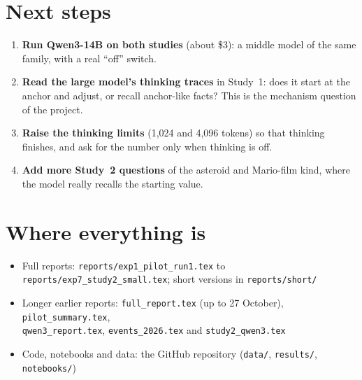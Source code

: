 \documentclass[11pt,a4paper]{article}
\begin{document}
\section{Next steps}
\begin{enumerate}[leftmargin=*]
  \item \textbf{Run Qwen3-14B on both studies} (about \$3): a middle model of the same family, with a real \enquote{off} switch.
  \item \textbf{Read the large model's thinking traces} in Study~1: does it start at the anchor and adjust, or recall anchor-like facts? This is the mechanism question of the project.
  \item \textbf{Raise the thinking limits} (1,024 and 4,096 tokens) so that thinking finishes, and ask for the number only when thinking is off.
  \item \textbf{Add more Study~2 questions} of the asteroid and Mario-film kind, where the model really recalls the starting value.
\end{enumerate}

\appendix
\section{Where everything is}
\begin{itemize}[leftmargin=*]
  \item Full reports: \texttt{reports/exp1\_pilot\_run1.tex} to \texttt{reports/exp7\_study2\_small.tex}; short versions in \texttt{reports/short/}
  \item Longer earlier reports: \texttt{full\_report.tex} (up to 27 October), \texttt{pilot\_summary.tex},\\ \texttt{qwen3\_report.tex}, \texttt{events\_2026.tex} and \texttt{study2\_qwen3.tex}
  \item Code, notebooks and data: the GitHub repository (\texttt{data/}, \texttt{results/}, \texttt{notebooks/})
\end{itemize}



\end{document}
